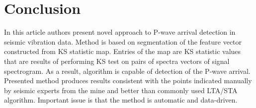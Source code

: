 \documentclass[smallextended]{svjour3}       %
\begin{document}
\section{Conclusion}

In this article authors present novel approach to P-wave arrival detection in seismic vibration data. Method is based on segmentation of the feature vector constructed from KS statistic map. Entries of the map are KS statistic values that are results of performing KS test on pairs of spectra vectors of signal spectrogram. As a result, algorithm is capable of detection of the P-wave arrival. Presented method produces results consistent with the points indicated manually by seismic experts from the mine and better than commonly used LTA/STA algorithm. Important issue is that the method is automatic and data-driven.


\end{document}
